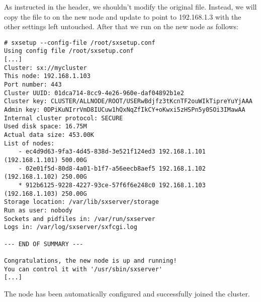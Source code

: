 As instructed in the header, we shouldn't modify the original file. Instead,
we will copy the file to  on the new node and
update  to point to 192.168.1.3 with the other settings
left untouched. After that we run  on the new node as follows:
\begin{lstlisting}
# sxsetup --config-file /root/sxsetup.conf 
Using config file /root/sxsetup.conf
[...]
Cluster: sx://mycluster
This node: 192.168.1.103
Port number: 443
Cluster UUID: 01dca714-8cc9-4e26-960e-daf04892b1e2
Cluster key: CLUSTER/ALLNODE/ROOT/USERwBdjfz3tKcnTF2ouWIkTipreYuYjAAA
Admin key: 0DPiKuNIrrVmD8IUCuw1hQxNqZfIkCY+oKwxi5zHSPn5y0SOi3IMawAA
Internal cluster protocol: SECURE
Used disk space: 16.75M
Actual data size: 453.00K
List of nodes:
    - ec4d9d63-9fa3-4d45-838d-3e521f124ed3 192.168.1.101 (192.168.1.101) 500.00G
    - 02e01f5d-80d8-4a01-b1f7-a56eecb8aef5 192.168.1.102 (192.168.1.102) 250.00G
    * 912b6125-9228-4227-93ce-57f6f6e248c0 192.168.1.103 (192.168.1.103) 250.00G
Storage location: /var/lib/sxserver/storage
Run as user: nobody
Sockets and pidfiles in: /var/run/sxserver
Logs in: /var/log/sxserver/sxfcgi.log

--- END OF SUMMARY ---

Congratulations, the new node is up and running!
You can control it with '/usr/sbin/sxserver'
[...]
\end{lstlisting}
The node has been automatically configured and successfully joined the cluster.
